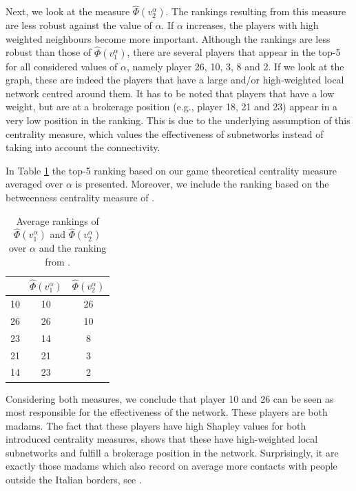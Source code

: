 \documentclass[10p]{article}
\theoremstyle{definition}
\theoremstyle{definition}
\begin{document}
Next, we look at the measure $\hat{\Phi}(v_2^\alpha)$. The rankings resulting from this measure are less robust against the value of $\alpha$. If $\alpha$ increases, the players with high weighted neighbours become more important. Although the rankings are less robust than those of $\hat{\Phi}(v_1^\alpha)$, there are several players that appear in the top-5 for all considered values of $\alpha$, namely player 26, 10, 3, 8 and 2. If we look at the graph, these are indeed the players that have a large and/or high-weighted local network centred around them. It has to be noted that players that have a low weight, but are at a brokerage position (e.g., player 18, 21 and 23) appear in a very low position in the ranking. This is due to the underlying assumption of this centrality measure, which values the effectiveness of subnetworks instead of taking into account the connectivity. 

In Table \ref{TableAverageRankings} the top-5 ranking based on our game theoretical centrality measure averaged over $\alpha$ is presented. Moreover, we include the ranking based on the betweenness centrality measure of \cite{mancuso2014not}.
\begin{table}[H]\centering
\begin{tabular}{*{3}{c}}
\toprule
\cite{mancuso2014not}
 & $\hat{\Phi}(v_1^\alpha)$ & $\hat{\Phi}(v_2^\alpha)$ \\
\midrule
10 & 10 & 26 \\ 
26 & 26 & 10\\ 
23 &14 & 8 \\ 
21 & 21& 3 \\ 
14 & 23& 2 \\ 
\bottomrule
\end{tabular}
\caption{Average rankings of $\hat{\Phi}(v_1^\alpha)$ and $\hat{\Phi}(v_2^\alpha)$ over $\alpha$ and the ranking from \cite{mancuso2014not}. \label{TableAverageRankings}}
\end{table}

\noindent Considering both measures, we conclude that player 10 and 26 can be seen as most responsible for the effectiveness of the network. These players are both madams. The fact that these players have high Shapley values for both introduced centrality measures, shows that these have high-weighted local subnetworks and fulfill a brokerage position in the network. Surprisingly, it are exactly those madams which also record on average more contacts with people outside the Italian borders, see \cite{mancuso2014not}. 
\end{document}
